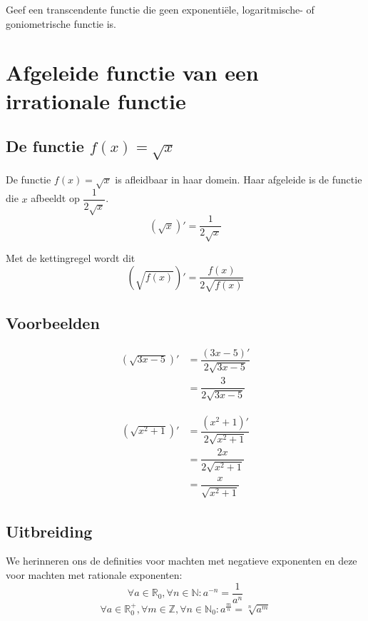 \documentclass[12pt]{article}
\begin{document}
\begin{oefening}
Geef een transcendente functie die geen exponentiële, logaritmische- of goniometrische functie is.
\end{oefening}


\pagebreak
\section{Afgeleide functie van een irrationale functie}

\subsection{De functie $f(x)=\sqrt{x}$}

De functie $f(x)=\sqrt{x}$ is afleidbaar in haar domein. Haar afgeleide is de functie die $x$ afbeeldt op $\dfrac{1}{2\sqrt{x}}$.
$$\left(\sqrt{x}\right)'=\dfrac{1}{2\sqrt{x}}$$

Met de kettingregel wordt dit
$$\left(\sqrt{f(x)}\right)'=\dfrac{f(x)}{2\sqrt{f(x)}}$$

\subsection{Voorbeelden}
\begin{minipage}{0.5\textwidth}
\begin{align*}
\left(\sqrt{3x-5}\right)' &= \dfrac{(3x-5)'}{2\sqrt{3x-5}}\\
                          &= \dfrac{3}{2\sqrt{3x-5}}
\end{align*}
\end{minipage}
\begin{minipage}{0.5\textwidth}
\begin{align*}
\left(\sqrt{x^2+1}\right)' &= \dfrac{(x^2+1)'}{2\sqrt{x^2+1}}\\
                           &= \dfrac{2x}{2\sqrt{x^2+1}}\\
                           &= \dfrac{x}{\sqrt{x^2+1}}
\end{align*}
\end{minipage}

\subsection{Uitbreiding}
We herinneren ons de definities voor machten met negatieve exponenten en deze voor machten met rationale exponenten:
$$\forall a\in\mathbb{R}_0, \forall n\in\mathbb{N} : a^{-n}=\dfrac{1}{a^n}$$
$$\forall a\in\mathbb{R}_0^+, \forall m\in\mathbb{Z}, \forall n\in\mathbb{N}_0 : a^{\frac{m}{n}}=\sqrt[n]{a^m}$$
\end{document}
